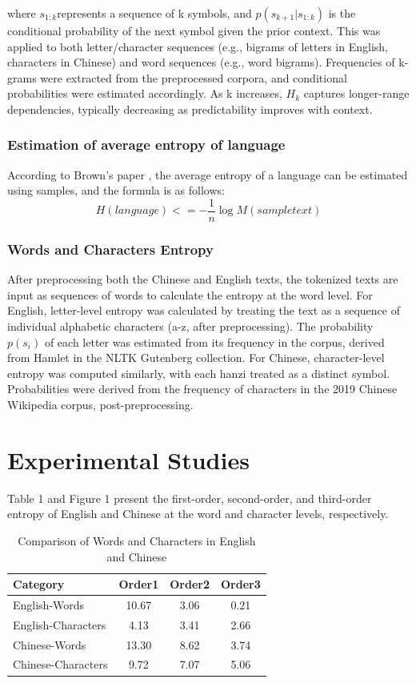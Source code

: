 \documentclass[12pt]{article}
\begin{document}
where $s_{1:k}$​ represents a sequence of k symbols, and $p(s_{k+1} | s_{1:k})$ is the conditional probability of the next symbol given the prior context. This was applied to both letter/character sequences (e.g., bigrams of letters in English, characters in Chinese) and word sequences (e.g., word bigrams). Frequencies of k-grams were extracted from the preprocessed corpora, and conditional probabilities were estimated accordingly. As k increases, $H_k$ captures longer-range dependencies, typically decreasing as predictability improves with context.
\subsubsection*{\centering Estimation of average entropy of language}
According to Brown's paper \cite{brown1992}, the average entropy of a language can be estimated using samples, and the formula is as follows:
\begin{equation}
    H(language)<=−\frac{1}{n}\log M(sample text)
\end{equation}
\subsubsection*{\centering Words and Characters Entropy} 
After preprocessing both the Chinese and English texts, the tokenized texts are input as sequences of words to calculate the entropy at the word level.
For English, letter-level entropy was calculated by treating the text as a sequence of individual alphabetic characters (a-z, after preprocessing). The probability  $p(s_i) $ of each letter was estimated from its frequency in the corpus, derived from Hamlet in the NLTK Gutenberg collection. For Chinese, character-level entropy was computed similarly, with each hanzi treated as a distinct symbol. Probabilities were derived from the frequency of characters in the 2019 Chinese Wikipedia corpus, post-preprocessing. 
\section*{\centering Experimental Studies}
Table 1 and Figure 1 present the first-order, second-order, and third-order entropy of English and Chinese at the word and character levels, respectively.
\begin{table}[h!]
\centering
\begin{tabular}{lccc}
\hline
\textbf{Category} & \textbf{Order1} & \textbf{Order2} & \textbf{Order3} \\
\hline
English-Words & 10.67 & 3.06 & 0.21 \\
English-Characters & 4.13 & 3.41 & 2.66 \\
Chinese-Words & 13.30 & 8.62 & 3.74 \\
Chinese-Characters & 9.72 & 7.07 & 5.06 \\
\hline
\end{tabular}
\caption{Comparison of Words and Characters in English and Chinese}
\label{tab:language_comparison}
\end{table}
\end{document}
